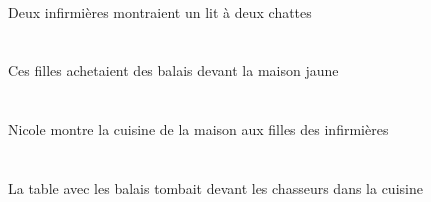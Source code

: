 \begin{exe}
   \INDDuErgG{}   \infirmiereADuErgG{}    \INDDuDatG{}   \chatDDuDatG{}   \INDSgAbsG{}   \litDSgAbsG{}  \montrerVdPstDSgG{} \\
 Deux infirmières montraient un lit à deux chattes
\ex\glll
    \DEFSgObl{}   \jauneDSg{}   \maisonDSgObl{}   \DEVANT{}   \DEMPlErg{}   \filleCPlErg{}   \INDPlAbs{}   \balaiAPlAbs{}  \acheterVtPstAPl{} \\
    \DEFSgOblP{}   \jauneDSgP{}   \maisonDSgOblP{}   \DEVANTP{}   \DEMPlErgP{}   \filleCPlErgP{}   \INDPlAbsP{}   \balaiAPlAbsP{}  \acheterVtPstAPlP{} \\
    \DEFSgOblG{}   \jauneDSgG{}   \maisonDSgOblG{}   \DEVANTG{}   \DEMPlErgG{}   \filleCPlErgG{}   \INDPlAbsG{}   \balaiAPlAbsG{}  \acheterVtPstAPlG{} \\
 Ces filles achetaient des balais devant la maison jaune
\ex\glll
   \INDSgErg{}   \NicoleBSgErg{}    \DEFPlObl{}    \DEFPlObl{}   \infirmiereAPlObl{}   \DE{}   \filleCPlObl{}   \A{}   \DEFSgAbs{}    \DEFSgObl{}   \maisonDSgObl{}   \DE{}   \cuisineDSgAbs{}  \montrerVdPrsDSg{} \\
   \INDSgErgP{}   \NicoleBSgErgP{}    \DEFPlOblP{}    \DEFPlOblP{}   \infirmiereAPlOblP{}   \DEP{}   \filleCPlOblP{}   \AP{}   \DEFSgAbsP{}    \DEFSgOblP{}   \maisonDSgOblP{}   \DEP{}   \cuisineDSgAbsP{}  \montrerVdPrsDSgP{} \\
   \INDSgErgG{}   \NicoleBSgErgG{}    \DEFPlOblG{}    \DEFPlOblG{}   \infirmiereAPlOblG{}   \DEG{}   \filleCPlOblG{}   \AG{}   \DEFSgAbsG{}    \DEFSgOblG{}   \maisonDSgOblG{}   \DEG{}   \cuisineDSgAbsG{}  \montrerVdPrsDSgG{} \\
 Nicole montre la cuisine de la maison aux filles des infirmières
\ex\glll
   \DEFSgAbs{}    \DEFPlObl{}   \balaiAPlObl{}   \AVEC{}   \tableDSgAbs{}    \DEFPlObl{}    \DEFSgObl{}   \cuisineDSgObl{}   \DANS{}   \chasseurCPlObl{}   \DEVANT{}  \tomberViPstDSg{} \\
   \DEFSgAbsP{}    \DEFPlOblP{}   \balaiAPlOblP{}   \AVECP{}   \tableDSgAbsP{}    \DEFPlOblP{}    \DEFSgOblP{}   \cuisineDSgOblP{}   \DANSP{}   \chasseurCPlOblP{}   \DEVANTP{}  \tomberViPstDSgP{} \\
   \DEFSgAbsG{}    \DEFPlOblG{}   \balaiAPlOblG{}   \AVECG{}   \tableDSgAbsG{}    \DEFPlOblG{}    \DEFSgOblG{}   \cuisineDSgOblG{}   \DANSG{}   \chasseurCPlOblG{}   \DEVANTG{}  \tomberViPstDSgG{} \\
 La table avec les balais tombait devant les chasseurs dans la cuisine
\ex\glll
    \DEFSgObl{}   \noirBSg{}   \chambreBSgObl{}   \DANS{}   \INDSgAbs{}   \tableDSgAbs{}  \tomberViPrsDSg{} \\

\end{exe}
